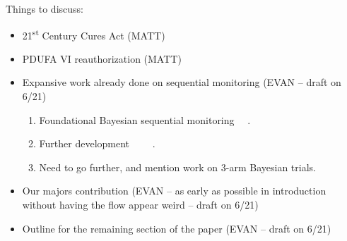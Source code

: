 \documentclass[12pt]{article}
\begin{document}
Things to discuss:
\begin{itemize}
 \item 21\textsuperscript{st} Century Cures Act (MATT)
 \item PDUFA VI reauthorization (MATT)
 \item Expansive work already done on sequential monitoring  (EVAN -- draft on 6/21)
\begin{enumerate}
\item Foundational Bayesian sequential monitoring \cite{Cornfield1966}~\cite{Cornfield1966a}~\cite{Neyman1967}.
\item Further development \cite{Freedman1989}~\cite{Freedman1992}~\cite{Spiegelhalter1993}~\cite{Spiegelhalter1994}~\cite{Fayers1997}.
\item Need to go further, and mention work on 3-arm Bayesian trials.
\end{enumerate}
 \item Our majors contribution (EVAN -- as early as possible in introduction without having the flow appear weird -- draft on 6/21)
 \item Outline for the remaining section of the paper (EVAN -- draft on 6/21)
\end{itemize}
\end{document}
